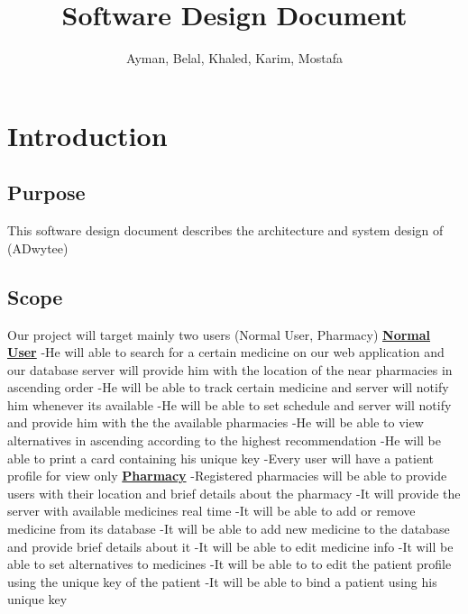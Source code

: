 \documentclass[]{article}
\title{Software Design Document}
\author{Ayman, Belal, Khaled, Karim, Mostafa}
\begin{document}
\maketitle

\section{Introduction}
\subsection{Purpose}
This software design document describes the architecture and system design of (ADwytee)


\subsection{Scope}
Our project will target mainly two users (Normal User, Pharmacy)
\newline
\newline
\textbf{\underline{Normal User}}
\newline
{}-He will able to search for a certain medicine on our web application and our database server will provide him with the location of the near pharmacies in 			ascending order
-He will be able to track certain medicine and server will notify him whenever its available
-He will be able to set schedule and server will notify and provide him with the the available pharmacies
-He will be able to view alternatives in ascending according to the highest recommendation
-He will be able to print a card containing his unique key
-Every user will have a patient profile for view only
\newline
\newline
\textbf{\underline{Pharmacy}}
\newline
{}-Registered pharmacies will be able to provide users with their location and brief details about the pharmacy
-It will provide the server with available medicines real time
-It will be able to add or remove medicine from its database
-It will be able to add new medicine to the database and provide brief details about it
-It will be able to edit medicine info 
-It will be able to set alternatives to medicines
-It will be able to to edit the patient profile using the unique key of the patient
-It will be able to bind a patient using his unique key 
\end{document}
